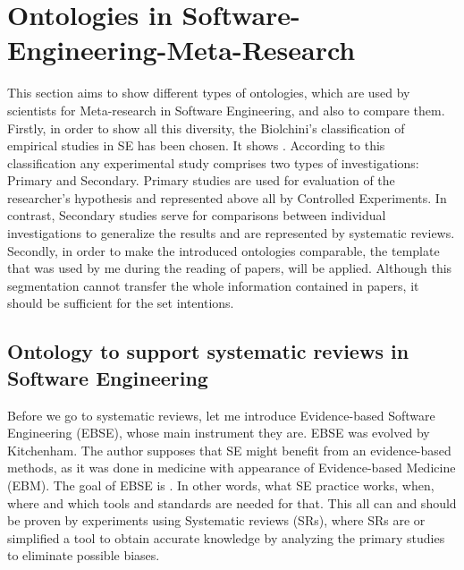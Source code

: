 		

\section{Ontologies in Software-Engineering-Meta-Research}
This section aims to show different types of ontologies, which are used by scientists for Meta-research in Software Engineering, and also to compare them.  \newline
 Firstly, in order to show all this diversity, the Biolchini's\cite{Bio07} classification of empirical studies in SE has been chosen. It shows \frqq\cite[p. 1]{Gar08}. According to this classification any experimental study comprises two types of investigations: Primary and Secondary\cite[p. 134]{Bio07}. Primary studies are used for evaluation of the researcher's hypothesis and represented above all by Controlled Experiments. In contrast, Secondary studies serve for comparisons between individual investigations to generalize the results and are represented by systematic reviews. \newline
 Secondly, in order to make the introduced ontologies comparable, the template  \frqq that was used by me during the reading of papers, will be applied. Although this segmentation cannot transfer the whole information contained in papers, it should be sufficient for the set intentions.
    
 
	\subsection{Ontology to support systematic reviews in Software Engineering}  
	Before we go to systematic reviews, let me introduce Evidence-based Software Engineering (EBSE), whose main instrument they are. EBSE was evolved by Kitchenham\cite{Kit04}. The author supposes that SE might benefit from an evidence-based methods, as it was done in medicine with appearance of Evidence-based Medicine (EBM). The goal of EBSE is \frqq \cite[p. 2]{Kit04}. In other words, what SE practice works,  when, where and which tools and standards are needed for that. This all can and should be proven by experiments using Systematic reviews (SRs), where SRs are \frqq \cite{Kit07} or simplified a tool to obtain accurate knowledge by analyzing the primary studies to eliminate possible biases. \newline
	

